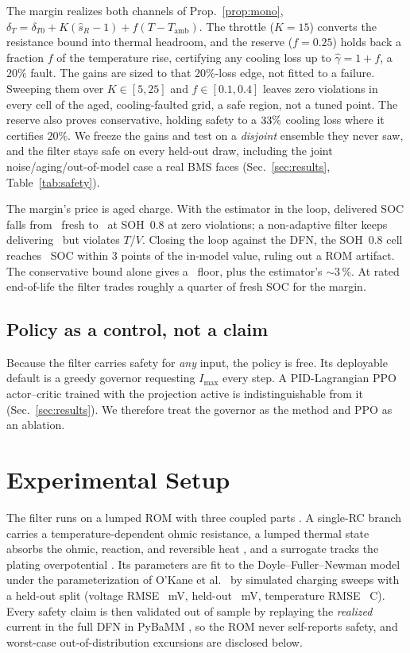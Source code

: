 \documentclass[conference]{IEEEtran}
\newcommand{\degC}{\textdegree C}
\newcommand{\SI}[2]{#1\,#2}
\begin{document}
The margin realizes both channels of Prop.~\ref{prop:mono},
$\delta_T{=}\delta_{T0}{+}K(\hat s_R{-}1){+}f(T{-}T_\mathrm{amb})$. The throttle ($K{=}15$) converts
the resistance bound into thermal headroom, and the reserve ($f{=}0.25$) holds back a fraction $f$ of
the temperature rise, certifying any cooling loss up to $\hat\gamma{=}1{+}f$, a $20\%$ fault. The
gains are sized to that $20\%$-loss edge, not fitted to a failure. Sweeping them over $K\in[5,25]$ and
$f\in[0.1,0.4]$ leaves zero violations in every cell of the aged, cooling-faulted grid, a safe region, not a tuned point. The reserve also proves conservative, holding safety to a $33\%$
cooling loss where it certifies $20\%$. We freeze the gains and test on a \emph{disjoint} ensemble they never saw, and the filter stays safe on
every held-out draw, including the joint noise/aging/out-of-model case a real BMS faces
(Sec.~\ref{sec:results}, Table~\ref{tab:safety}).

The margin's price is aged charge. With the estimator in the loop, delivered SOC falls from
\estSocFresh\ fresh to \estSocAged\ at SOH~0.8 at zero violations; a non-adaptive filter keeps
delivering \estNomSocAged\ but violates $T$/$V$. Closing the loop against the DFN, the SOH~0.8 cell
reaches \clSocAged\ SOC within $3$ points of the in-model value, ruling out a ROM artifact. The conservative bound alone gives a \clOracleSocAged\ floor, plus the estimator's $\sim$\SI{3}{\%}. At
rated end-of-life the filter trades roughly a quarter of fresh SOC for the margin.

\subsection{Policy as a control, not a claim}
Because the filter carries safety for \emph{any} input, the policy is free. Its deployable default is a
greedy governor requesting $I_{\max}$ every step. A PID-Lagrangian PPO actor--critic
\cite{schulman2017ppo,stooke2020pid} trained with the projection active is indistinguishable from it
(Sec.~\ref{sec:results}). We therefore treat the governor as the method and PPO as an ablation.

\section{Experimental Setup}
The filter runs on a lumped ROM with three coupled parts \cite{newman2004}. A single-RC branch carries
a temperature-dependent ohmic resistance, a lumped thermal state absorbs the ohmic, reaction, and
reversible heat \cite{bernardi1985}, and a surrogate tracks the plating overpotential
\cite{yang2017plating}. Its parameters are fit to the Doyle--Fuller--Newman model
\cite{doyle1993,fuller1994} under the parameterization of O'Kane et al.\ \cite{okane2022} by simulated charging
sweeps with a held-out split (voltage RMSE
\VRMSE~mV, held-out \VRMSEho~mV, temperature RMSE \TRMSE~\degC).
Every
safety claim is then validated out of sample by replaying the \emph{realized} current in the full DFN
in PyBaMM \cite{sulzer2021pybamm}, so the ROM never self-reports safety, and worst-case out-of-distribution excursions are disclosed below.
\end{document}
